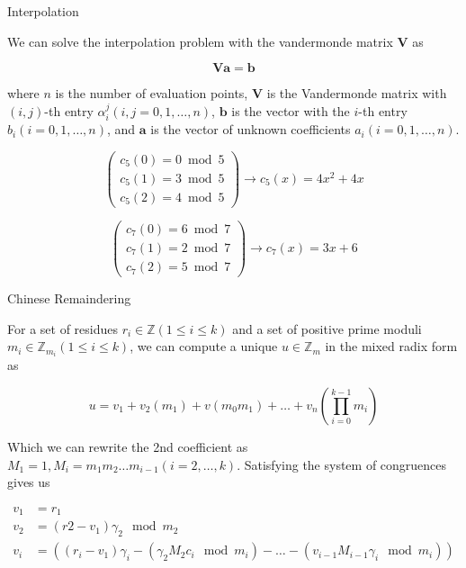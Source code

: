 \documentclass{beamer}
\begin{document}
	
	\begin{frame}{Interpolation}
	

		We can solve the interpolation problem with the vandermonde matrix $ \mathbf{V} $ as
		
		$$\mathbf{V} \mathbf{a} = \mathbf{b}  $$
		
		where $n$ is the number of evaluation points, $\mathbf{V}$ is the Vandermonde matrix with $(i,j)$-th entry $\alpha_i^j(i,j=0,1,\dots,n)$, $\mathbf{b}$ is the vector with the $i$-th entry $b_i(i=0,1,\dots,n)$, and $\mathbf{a}$ is the vector of unknown coefficients $a_i(i=0,1,\dots,n)$.
		
		\[\left( \begin{array}{l}
		{c_5}(0) = 0\bmod 5\\
		{c_5}(1) = 3\bmod 5\\
		{c_5}(2) = 4\bmod 5
		\end{array} \right) \to {c_5}(x) = 4{x^2} + 4x\]
				
		\[\left( \begin{array}{l}
		{c_7}(0) = 6\bmod 7\\
		{c_7}(1) = 2\bmod 7\\
		{c_7}(2) = 5\bmod 7
		\end{array} \right) \to {c_7}(x) = 3x + 6\]
		
		
		
	\end{frame}
	
	\begin{frame}{Chinese Remaindering}
		
		For a set of residues $r_i \in \mathbb{Z}(1\leq i \leq k)$ and a set of positive prime moduli $m_i \in \mathbb{Z}_{m_i}(1 \leq i \leq k)$, we can compute a unique $u \in \mathbb{Z}_m$ in the mixed radix form  as
		
		$$u = v_1 + v_2(m_1) + v(m_0m_1) + \dots + v_n\left( \prod_{i=0}^{k-1}m_i \right)  $$
		
		Which we can rewrite the 2nd coefficient as $M_1 = 1, M_i = m_1m_2\dots m_{i-1}(i=2,\dots,k)$. Satisfying the system of congruences gives us
		
		\begin{align*}
		v_1 &= r_1 \\
		v_2 &= (r2-v_1)\gamma_2 \mod m_2\\
		v_i &= ((r_i-v_1)\gamma_i - (\gamma_2M_2c_i \mod m_i) - \dots -(v_{i-1}M_{i-1}\gamma_i \mod{m_i}))
		\end{align*}
		
	
		\end{frame}
		
\end{document}
